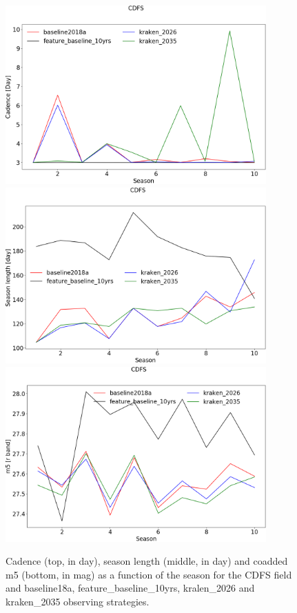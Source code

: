 

\begin{figure}[htbp]
\begin{center}
  \includegraphics[width=10cm]{Figures/CDFS_cadence.png}
  \includegraphics[width=10cm]{Figures/CDFS_season_length.png}
  \includegraphics[width=10cm]{Figures/CDFS_m5.png}
 \caption{Cadence (top, in day), season length (middle, in day) and coadded m5 (bottom, in mag) as a function of the season for the CDFS field and baseline18a, feature\_baseline\_10yrs, kralen\_2026 and kraken\_2035 observing strategies.}\label{fig:cdfs_cad}
\end{center}
\end{figure}

